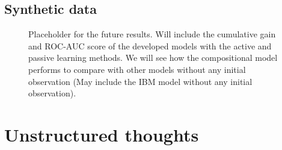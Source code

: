 \subsection{Synthetic data}
\begin{figure}[t]
	\centering
	
	\caption{Placeholder for the future results. Will include the cumulative gain and ROC-AUC score of the developed models with the active and passive learning methods. We will see how the compositional model performs to compare with other models without any initial observation (May include the IBM model without any initial observation).}
\end{figure}

\section{Unstructured thoughts}

